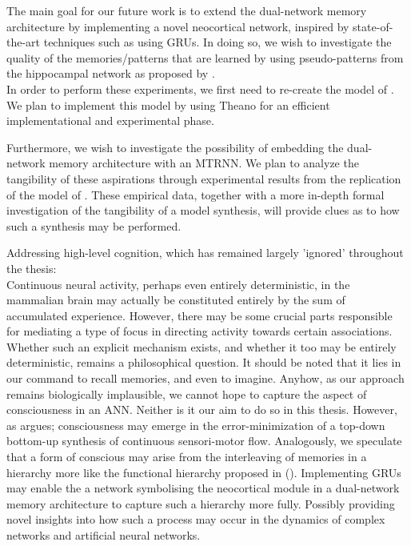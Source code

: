 The main goal for our future work is to extend the dual-network memory architecture by implementing a novel neocortical network, inspired by state-of-the-art techniques such as using GRUs. In doing so, we wish to investigate the quality of the memories/patterns that are learned by using pseudo-patterns from the hippocampal network as proposed by \cite{Hattori2014}.
\\
In order to perform these experiments, we first need to re-create the model of \cite{Hattori2014}. We plan to implement this model by using Theano for an efficient implementational and experimental phase.

Furthermore, we wish to investigate the possibility of embedding the dual-network memory architecture with an MTRNN. We plan to analyze the tangibility of these aspirations through experimental results from the replication of the model of \cite{Hattori2014}. These empirical data, together with a more in-depth formal investigation of the tangibility of a model synthesis, will provide clues as to how such a synthesis may be performed.

Addressing high-level cognition, which has remained largely 'ignored' throughout the thesis:
\\
Continuous neural activity, perhaps even entirely deterministic, in the mammalian brain may actually be constituted entirely by the sum of accumulated experience. However, there may be some crucial parts responsible for mediating a type of focus in directing activity towards certain associations. Whether such an explicit mechanism exists, and whether it too may be entirely deterministic, remains a philosophical question. It should be noted that it lies in our command to recall memories, and even to imagine.
Anyhow, as our approach remains biologically implausible, we cannot hope to capture the aspect of consciousness in an ANN. Neither is it our aim to do so in this thesis. However, as \cite{Tani2014} argues; consciousness may emerge in the error-minimization of a top-down bottom-up synthesis of continuous sensori-motor flow. Analogously, we speculate that a form of conscious may arise from the interleaving of memories in a hierarchy more like the functional hierarchy proposed in (\cite{Yamashita2008, Tani2014}). Implementing GRUs may enable the a network symbolising the neocortical module in a dual-network memory architecture to capture such a hierarchy more fully. Possibly providing novel insights into how such a process may occur in the dynamics of complex networks and artificial neural networks.

